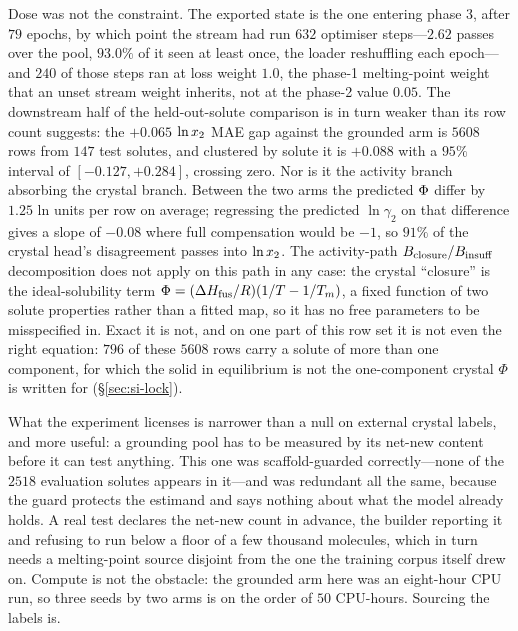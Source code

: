 Dose was not the constraint. The exported state is the one entering phase 3, after $79$ epochs, by which point the stream had run $632$ optimiser steps---$2.62$ passes over the pool, $93.0\%$ of it seen at least once, the loader reshuffling each epoch---and $240$ of those steps ran at loss weight $1.0$, the phase-1 melting-point weight that an unset stream weight inherits, not at the phase-2 value $0.05$. The downstream half of the held-out-solute comparison is in turn weaker than its row count suggests: the $+0.065$ $\ln x_2$ MAE gap against the grounded arm is $5608$ rows from $147$ test solutes, and clustered by solute it is $+0.088$ with a $95\%$ interval of $[-0.127,+0.284]$, crossing zero. Nor is it the activity branch absorbing the crystal branch. Between the two arms the predicted $\Phi$ differ by $1.25$ ln units per row on average; regressing the predicted $\ln\gamma_2$ on that difference gives a slope of $-0.08$ where full compensation would be $-1$, so $91\%$ of the crystal head's disagreement passes into $\ln x_2$. The activity-path $B_{\mathrm{closure}}/B_{\mathrm{insuff}}$ decomposition does not apply on this path in any case: the crystal ``closure'' is the ideal-solubility term $\Phi=(\Delta H_{\mathrm{fus}}/R)(1/T-1/T_m)$, a fixed function of two solute properties rather than a fitted map, so it has no free parameters to be misspecified in. Exact it is not, and on one part of this row set it is not even the right equation: $796$ of these $5608$ rows carry a solute of more than one component, for which the solid in equilibrium is not the one-component crystal $\Phi$ is written for (\S\ref{sec:si-lock}).

What the experiment licenses is narrower than a null on external crystal labels, and more useful: a grounding pool has to be measured by its net-new content before it can test anything. This one was scaffold-guarded correctly---none of the $2518$ evaluation solutes appears in it---and was redundant all the same, because the guard protects the estimand and says nothing about what the model already holds. A real test declares the net-new count in advance, the builder reporting it and refusing to run below a floor of a few thousand molecules, which in turn needs a melting-point source disjoint from the one the training corpus itself drew on. Compute is not the obstacle: the grounded arm here was an eight-hour CPU run, so three seeds by two arms is on the order of $50$ CPU-hours. Sourcing the labels is.
